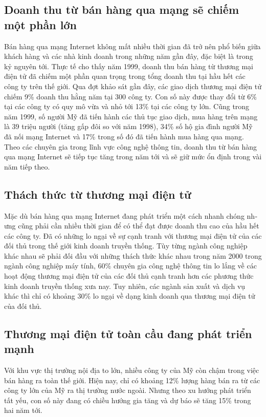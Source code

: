 \documentclass[12pt]{article}
\begin{document}
\subsection{Doanh thu từ bán hàng qua mạng sẽ chiếm một phần lớn}
Bán hàng qua mạng Internet không mất nhiều thời gian đã trở nên phổ biến giữa khách hàng và các nhà kinh doanh trong những năm gần đây, đặc biệt là trong kỷ nguyên tới. Thực tế cho thấy năm 1999, doanh thu bán hàng từ th­ương mại điện tử đã chiếm một phần quan trọng trong tổng doanh thu tại hầu hết các công ty trên thế giới. Qua đợt khảo sát gần đây, các giao dịch th­ương mại điện tử chiếm 9\% doanh thu hằng năm tại 300 công ty. Con số này đ­ược thay đổi từ 6\% tại các công ty có quy mô vừa và nhỏ tới 13\% tại các công ty lớn. Cũng trong năm 1999, số ngư­ời Mỹ đã tiến hành các thủ tục giao dịch, mua hàng trên mạng là 39 triệu người (tăng gấp đôi so với năm 1998), 34\% số hộ gia đình ng­ười Mỹ đã nối mạng Internet và 17\% trong số đó đã tiến hành mua hàng qua mạng.
Theo các chuyên gia trong lĩnh vực công nghệ thông tin, doanh thu từ bán hàng qua mạng Internet sẽ tiếp tục tăng trong năm tới và sẽ giữ mức ổn định trong vài năm tiếp theo.

\subsection{Thách thức từ thư­ơng mại điện tử}
Mặc dù bán hàng qua mạng Internet đang phát triển một cách nhanh chóng nh­ưng cũng phải cần nhiều thời gian để có thể đạt đ­ược doanh thu cao của hầu hết các công ty. Đã có những lo ngại về sự cạnh tranh với th­ương mại điện tử của các đối thủ trong thế giới kinh doanh truyền thống. Tùy từng ngành công nghiệp khác nhau sẽ phải đối đầu với những thách thức khác nhau trong năm 2000 trong ngành công nghiệp máy tính, 60\% chuyên gia công nghệ thông tin lo lắng về các hoạt động thư­ơng mại điện tử của các đối thủ cạnh tranh hơn các ph­ương thức kinh doanh truyền thống x­ưa nay. Tuy nhiên, các ngành sản xuất và dịch vụ khác thì chỉ có khoảng 30\% lo ngại về dạng kinh doanh qua th­ương mại điện tử của đối thủ.

\subsection{Th­ương mại điện tử toàn cầu đang phát triển mạnh}
Với khu vực thị trư­ờng nội địa to lớn, nhiều công ty của Mỹ còn chậm trong việc bán hàng ra toàn thế giới. Hiện nay, chỉ có khoảng 12\% lượng hàng bán ra từ các công ty lớn của Mỹ ra thị tr­ường n­ước ngoài. Nh­ưng theo xu h­ướng phát triển tất yếu, con số này đang có chiều hư­ớng gia tăng và dự báo sẽ tăng 15\% trong hai năm tới.
\end{document}
